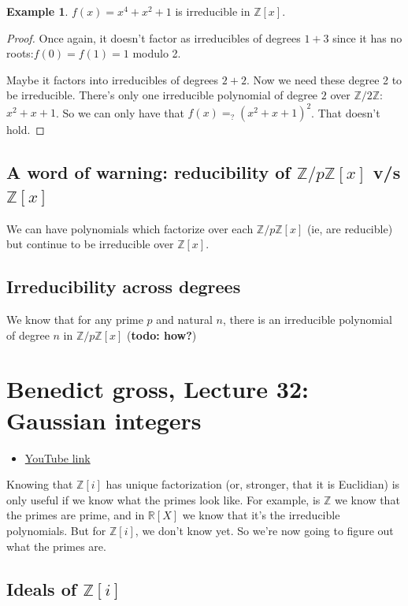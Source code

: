 \documentclass{book}
\newcommand{\Z}{\ensuremath{\mathbb{Z}}}
\newcommand{\R}{\ensuremath{\mathbb{R}}}
\theoremstyle{definition}
\newtheorem{example}[theorem]{Example}
\begin{document}
\begin{example}
    $f(x) = x^4 + x^2 + 1$ is irreducible in $\Z[x]$.
\end{example}
\begin{proof}
    Once again, it doesn't factor as irreducibles of degrees $1 + 3$ since it has
    no roots:$f(0) = f(1) = 1$ modulo 2.

    Maybe it factors into irreducibles of degrees $2 + 2$.
    Now we need these degree 2 to be irreducible. There's only one
    irreducible polynomial of degree $2$ over $\Z/2\Z$: $x^2 + x + 1$.
    So we can only have that $f(x) =_? (x^2 + x + 1)^2$. That doesn't hold.
\end{proof}

\section{A word of warning: reducibility of $\Z/p\Z[x]$ v/s $\Z[x]$}

We can have polynomials which factorize over each $\Z/p\Z[x]$ (ie, are reducible)
but continue to be irreducible over $\Z[x]$.

\section{Irreducibility across degrees}

We know that for any prime $p$ and natural $n$, there is an irreducible
polynomial of degree $n$ in $\Z/p\Z[x]$ (\textbf{todo: how?})

\chapter{Benedict gross, Lecture 32: Gaussian integers}
\begin{itemize}
    \item \href{https://www.youtube.com/watch?v=Ln6IgLksDxE&list=PLelIK3uylPMGzHBuR3hLMHrYfMqWWsmx5&index=32}{YouTube link}
\end{itemize}

Knowing that $\Z[i]$ has unique factorization (or, stronger, that it is Euclidian)
is only useful if we know what the primes look like. For example, is $\Z$
we know that the primes are prime, and in $\R[X]$ we know that it's the 
irreducible polynomials. But for $\Z[i]$, we don't know yet. So we're now
going to figure out what the primes are.

\section{Ideals of $\Z[i]$}
\end{document}
